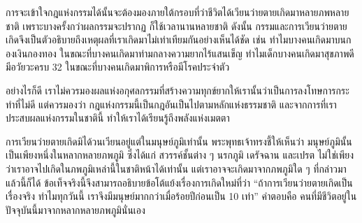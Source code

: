 \documentclass[12pt, openany]{book}
\begin{document}
การ{\wbr}จะ{\wbr}เข้าใจ{\wbr}กฎ{\wbr}แห่ง{\wbr}กรรม{\wbr}ได้{\wbr}นั้น{\wbr}จะ{\wbr}ต้อง{\wbr}มอง{\wbr}ภาย{\wbr}ใต้{\wbr}กรอบ{\wbr}ที่{\wbr}ว่า{\wbr}ชีวิต{\wbr}ได้{\wbr}เวียน{\wbr}ว่าย{\wbr}ตาย{\wbr}เกิด{\wbr}มา{\wbr}หลาย{\wbr}ภพ{\wbr}หลาย{\wbr}ชาติ เพราะ{\wbr}บาง{\wbr}ครั้ง{\wbr}กว่า{\wbr}ผล{\wbr}กรรม{\wbr}จะ{\wbr}ปรากฏ ก็{\wbr}ใช้{\wbr}เวลา{\wbr}นาน{\wbr}หลาย{\wbr}ชาติ  ดังนั้น กรรม{\wbr}และ{\wbr}การ{\wbr}เวียน{\wbr}ว่าย{\wbr}ตาย{\wbr}เกิด{\wbr}จึง{\wbr}เป็น{\wbr}ตัว{\wbr}อธิบาย{\wbr}ถึง{\wbr}เหตุผล{\wbr}ที่{\wbr}เรา{\wbr}เกิด{\wbr}มา{\wbr}ไม่{\wbr}เท่าเทียม{\wbr}กัน{\wbr}อย่าง{\wbr}เห็น{\wbr}ได้{\wbr}ชัด เช่น ทำไม{\wbr}บาง{\wbr}คน{\wbr}เกิด{\wbr}มา{\wbr}บน{\wbr}กอง{\wbr}เงิน{\wbr}กอง{\wbr}ทอง ใน{\wbr}ขณะ{\wbr}ที่{\wbr}บาง{\wbr}คน{\wbr}เกิด{\wbr}มา{\wbr}ท่ามกลาง{\wbr}ความ{\wbr}ยากไร้{\wbr}แสน{\wbr}เข็ญ  ทำไม{\wbr}เด็ก{\wbr}บาง{\wbr}คน{\wbr}เกิด{\wbr}มา{\wbr}สุขภาพ{\wbr}ดี มี{\wbr}อวัยวะ{\wbr}ครบ 32 ใน{\wbr}ขณะ{\wbr}ที่{\wbr}บาง{\wbr}คน{\wbr}เกิด{\wbr}มา{\wbr}พิการ{\wbr}หรือ{\wbr}มี{\wbr}โรค{\wbr}ประจำ{\wbr}ตัว  

อย่างไร{\wbr}ก็{\wbr}ดี เรา{\wbr}ไม่{\wbr}ควร{\wbr}มอง{\wbr}ผล{\wbr}แห่ง{\wbr}อกุศล{\wbr}กรรม{\wbr}ที่{\wbr}สร้าง{\wbr}ความ{\wbr}ทุกข์{\wbr}ยาก{\wbr}ให้{\wbr}เรา{\wbr}นั้น{\wbr}ว่า{\wbr}เป็น{\wbr}การ{\wbr}ลงโทษ{\wbr}การ{\wbr}กระทำ{\wbr}ที่{\wbr}ไม่{\wbr}ดี แต่{\wbr}ควร{\wbr}มอง{\wbr}ว่า กฎ{\wbr}แห่ง{\wbr}กรรม{\wbr}นี้{\wbr}เป็น{\wbr}กฎ{\wbr}อัน{\wbr}เป็น{\wbr}ไป{\wbr}ตาม{\wbr}หลัก{\wbr}แห่ง{\wbr}ธรรมชาติ  และ{\wbr}จาก{\wbr}การ{\wbr}ที่{\wbr}เรา{\wbr}ประสบ{\wbr}ผล{\wbr}แห่ง{\wbr}กรรม{\wbr}ใน{\wbr}ชาติ{\wbr}นี้ ทำให้{\wbr}เรา{\wbr}ได้{\wbr}เรียนรู้{\wbr}ถึง{\wbr}พลัง{\wbr}แห่ง{\wbr}เมตตา{\wbr}

การ{\wbr}เวียน{\wbr}ว่าย{\wbr}ตาย{\wbr}เกิด{\wbr}มิ{\wbr}ได้{\wbr}วนเวียน{\wbr}อยู่{\wbr}แต่{\wbr}ใน{\wbr}มนุษย์{\wbr}ภูมิ{\wbr}เท่านั้น  พระพุทธเจ้า{\wbr}ทรง{\wbr}ชี้{\wbr}ให้{\wbr}เห็น{\wbr}ว่า มนุษย์{\wbr}ภูมิ{\wbr}นั้น{\wbr}เป็น{\wbr}เพียง{\wbr}หนึ่ง{\wbr}ใน{\wbr}หลากหลาย{\wbr}ภพ{\wbr}ภูมิ ซึ่ง{\wbr}ได้แก่ สวรรค์{\wbr}ชั้น{\wbr}ต่าง ๆ นรก{\wbr}ภูมิ เดรัจฉาน และ{\wbr}เปรต  ไม่{\wbr}ใช่{\wbr}เพียง{\wbr}ว่า{\wbr}เรา{\wbr}อาจ{\wbr}ไป{\wbr}เกิด{\wbr}ใน{\wbr}ภพ{\wbr}ภูมิ{\wbr}เหล่า{\wbr}นี้{\wbr}ใน{\wbr}ชาติ{\wbr}หน้า{\wbr}ได้{\wbr}เท่านั้น แต่{\wbr}เรา{\wbr}อาจ{\wbr}จะ{\wbr}เกิด{\wbr}มา{\wbr}จาก{\wbr}ภพ{\wbr}ภูมิ{\wbr}ใด ๆ ที่{\wbr}กล่าว{\wbr}มา{\wbr}แล้ว{\wbr}นี้{\wbr}ก็{\wbr}ได้  ข้อเท็จจริง{\wbr}นี้{\wbr}จึง{\wbr}สามารถ{\wbr}อธิบาย{\wbr}ข้อ{\wbr}โต้แย้ง{\wbr}เรื่อง{\wbr}การ{\wbr}เกิด{\wbr}ใหม่{\wbr}ที่{\wbr}ว่า “ถ้า{\wbr}การ{\wbr}เวียน{\wbr}ว่าย{\wbr}ตาย{\wbr}เกิด{\wbr}เป็น{\wbr}เรื่อง{\wbr}จริง ทำไม{\wbr}ทุก{\wbr}วัน{\wbr}นี้ เรา{\wbr}จึง{\wbr}มี{\wbr}มนุษย์{\wbr}มาก{\wbr}กว่า{\wbr}เมื่อ{\wbr}ร้อย{\wbr}ปี{\wbr}ก่อน{\wbr}เป็น 10 เท่า”  คำ{\wbr}ตอบ{\wbr}คือ คน{\wbr}ที่{\wbr}มี{\wbr}ชีวิต{\wbr}อยู่{\wbr}ใน{\wbr}ปัจจุบัน{\wbr}นี้{\wbr}มา{\wbr}จาก{\wbr}หลากหลาย{\wbr}ภพ{\wbr}ภูมิ{\wbr}นั่นเอง{\wbr}
\end{document}
